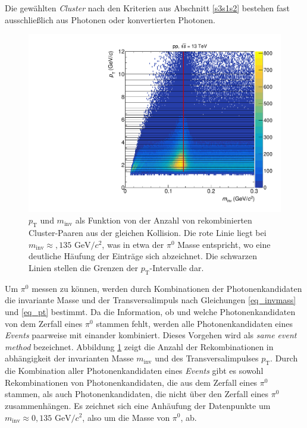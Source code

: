 Die gew\"ahlten \textit{Cluster} nach den Kriterien aus Abschnitt \ref{s3s1s2} bestehen fast ausschlie{\ss}lich aus Photonen oder konvertierten Photonen.
\newline
\begin{figure}[tp]
\centering
\includegraphics[width=.7\linewidth]{hInvMass_pT_Signal.pdf}
\caption{$p_\text{T}$ und $m_\text{inv}$ als Funktion von der Anzahl von rekombinierten  Cluster-Paaren aus der gleichen Kollision.
Die rote Linie liegt bei $m_{\text{inv}}\approx,135\text{ GeV/}c^{2}$, was in etwa der $\pi^{0}$ Masse entspricht, wo eine deutliche H\"aufung der Eintr\"age sich abzeichnet.
Die schwarzen Linien stellen die Grenzen der $p_{\text{T}}$-Intervalle dar.}
\label{figInvMassPt_a}
\end{figure}
Um $\pi^{0}$ messen zu k\"onnen, werden durch Kombinationen der Photonenkandidaten die invariante Masse und der Transversalimpuls nach Gleichungen \ref{eq_invmass} und \ref{eq_pt} bestimmt.
Da die Information, ob und welche Photonenkandidaten von dem Zerfall eines $\pi^{0}$ stammen fehlt, werden alle Photonenkandidaten eines \textit{Events} paarweise mit einander kombiniert.
Dieses Vorgehen wird als \textit{same event method} bezeichnet.
Abbildung \ref{figInvMassPt_a} zeigt die Anzahl der Rekombinationen in abh\"angigkeit der invarianten Masse $m_{\text{inv}}$ und des Transversalimpulses $p_{\text{T}}$.
Durch die Kombination aller Photonenkandidaten eines \textit{Events} gibt es sowohl Rekombinationen von Photonenkandidaten, die aus dem Zerfall eines $\pi^{0}$ stammen, als auch Photonenkandidaten, die nicht \"uber den Zerfall eines $\pi^{0}$ zusammenh\"angen.
Es zeichnet sich eine Anh\"aufung der Datenpunkte um $m_{\text{inv}}\approx 0,135\text{ GeV}/c^{2}$, also um die Masse von $\pi^{0}$, ab.
